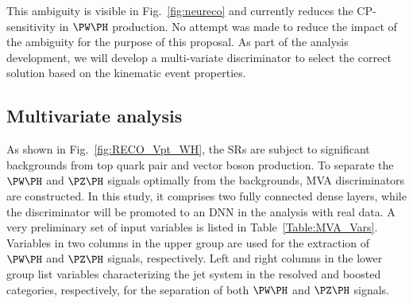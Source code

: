 \documentclass[a4paper,11pt]{article}
\begin{document}
This ambiguity is visible in Fig.~\ref{fig:neureco} and currently reduces the CP-sensitivity in $\PW\PH$ production. 
No attempt was made to reduce the impact of the ambiguity for the purpose of this proposal. 
As part of the analysis development, we will develop a multi-variate discriminator to select the correct solution based on the kinematic event properties. %

\subsection{Multivariate analysis}

As shown in Fig.~\ref{fig:RECO_Vpt_WH}, the SRs are subject to significant backgrounds from top quark pair  and vector boson production.
To separate the  $\PW\PH$ and $\PZ\PH$ signals optimally from the backgrounds, MVA discriminators are constructed. 
In this study, it comprises two fully connected dense layers, while the discriminator will be promoted to an DNN in the analysis with real data.
A very preliminary set of input variables is listed in Table~\ref{Table:MVA_Vars}.
Variables in two columns in the upper group are used for the extraction of $\PW\PH$ and $\PZ\PH$ signals, respectively.
Left and right columns in the lower group list variables characterizing the jet system in the resolved and boosted categories, respectively, for the separation of both $\PW\PH$ and $\PZ\PH$ signals.
\end{document}
